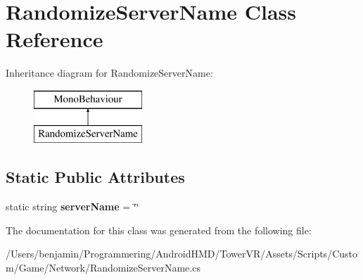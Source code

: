 \hypertarget{class_randomize_server_name}{}\section{Randomize\+Server\+Name Class Reference}
\label{class_randomize_server_name}
Inheritance diagram for Randomize\+Server\+Name\+:\begin{figure}[H]
\begin{center}
\leavevmode
\includegraphics[height=2.000000cm]{class_randomize_server_name}
\end{center}
\end{figure}
\subsection*{Static Public Attributes}
\begin{DoxyCompactItemize}
\item 
static string {\bfseries server\+Name} = \char`\"{}\char`\"{}\hypertarget{class_randomize_server_name_a49311095fceb7d53a264e018f5a5897c}{}\label{class_randomize_server_name_a49311095fceb7d53a264e018f5a5897c}

\end{DoxyCompactItemize}


The documentation for this class was generated from the following file\+:\begin{DoxyCompactItemize}
\item 
/\+Users/benjamin/\+Programmering/\+Android\+H\+M\+D/\+Tower\+V\+R/\+Assets/\+Scripts/\+Custom/\+Game/\+Network/Randomize\+Server\+Name.\+cs\end{DoxyCompactItemize}
